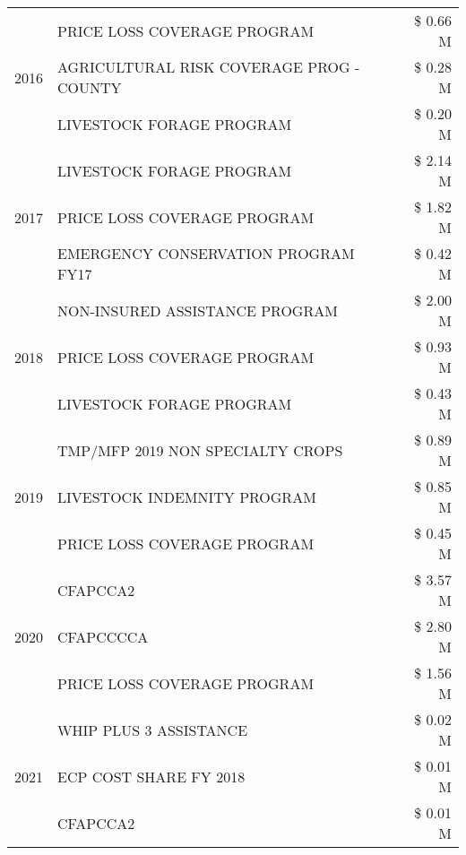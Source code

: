 \begin{tabular}{llr}
\cline{1-3}
\multirow[t]{3}{*}{2016} & PRICE LOSS COVERAGE PROGRAM & \$ 0.66 M \\
 & AGRICULTURAL RISK COVERAGE PROG - COUNTY & \$ 0.28 M \\
 & LIVESTOCK FORAGE PROGRAM & \$ 0.20 M \\
\cline{1-3}
\multirow[t]{3}{*}{2017} & LIVESTOCK FORAGE PROGRAM & \$ 2.14 M \\
 & PRICE LOSS COVERAGE PROGRAM & \$ 1.82 M \\
 & EMERGENCY CONSERVATION PROGRAM FY17 & \$ 0.42 M \\
\cline{1-3}
\multirow[t]{3}{*}{2018} & NON-INSURED ASSISTANCE PROGRAM & \$ 2.00 M \\
 & PRICE LOSS COVERAGE PROGRAM & \$ 0.93 M \\
 & LIVESTOCK FORAGE PROGRAM & \$ 0.43 M \\
\cline{1-3}
\multirow[t]{3}{*}{2019} & TMP/MFP 2019 NON SPECIALTY CROPS & \$ 0.89 M \\
 & LIVESTOCK INDEMNITY PROGRAM & \$ 0.85 M \\
 & PRICE LOSS COVERAGE PROGRAM & \$ 0.45 M \\
\cline{1-3}
\multirow[t]{3}{*}{2020} & CFAPCCA2 & \$ 3.57 M \\
 & CFAPCCCCA & \$ 2.80 M \\
 & PRICE LOSS COVERAGE PROGRAM & \$ 1.56 M \\
\cline{1-3}
\multirow[t]{3}{*}{2021} & WHIP PLUS 3 ASSISTANCE & \$ 0.02 M \\
 & ECP COST SHARE FY 2018 & \$ 0.01 M \\
 & CFAPCCA2 & \$ 0.01 M \\
\cline{1-3}
\bottomrule
\end{tabular}
